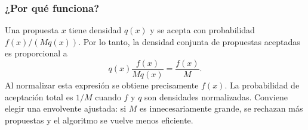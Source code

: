 

\subsubsection{¿Por qué funciona?}

Una propuesta $x$ tiene densidad $q(x)$ y se acepta con probabilidad
$f(x)/(Mq(x))$. Por lo tanto, la densidad conjunta de propuestas aceptadas
es proporcional a
\[
    q(x)\frac{f(x)}{Mq(x)}=\frac{f(x)}{M}.
\]
Al normalizar esta expresión se obtiene precisamente $f(x)$. La probabilidad
de aceptación total es $1/M$ cuando $f$ y $q$ son densidades normalizadas.
Conviene elegir una envolvente ajustada: si $M$ es innecesariamente grande,
se rechazan más propuestas y el algoritmo se vuelve menos eficiente.